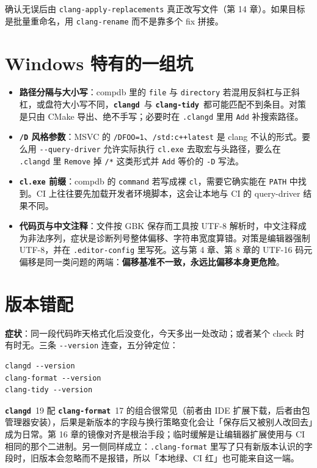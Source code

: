 \documentclass[12pt,a4paper,fontset=fandol]{ctexbook}
\newcommand{\Opt}[1]{\texttt{-\/-#1}}
\newcommand{\Lib}[1]{\textbf{\texttt{#1}}}
\newcommand{\Tidy}{\Lib{clang-tidy}}
\newcommand{\Fmt}{\Lib{clang-format}}
\newcommand{\CD}{\Lib{clangd}}
\begin{document}
确认无误后由 \texttt{clang-apply-replacements} 真正改写文件（第 14 章）。如果目标是批量重命名，用 \texttt{clang-rename} 而不是靠多个 fix 拼接。

\section{Windows 特有的一组坑}\label{sec:ch17-s9}

\begin{itemize}
  \item \textbf{路径分隔与大小写}：compdb 里的 \texttt{file} 与 \texttt{directory} 若混用反斜杠与正斜杠，或盘符大小写不同，\CD\ 与 \Tidy\ 都可能匹配不到条目。对策是只由 CMake 导出、绝不手写；必要时在 \texttt{.clangd} 里用 \texttt{Add} 补搜索路径。
  \item \textbf{\texttt{/D} 风格参数}：MSVC 的 \texttt{/DFOO=1}、\texttt{/std:c++latest} 是 clang 不认的形式。要么用 \Opt{query-driver} 允许实际执行 \texttt{cl.exe} 去取宏与头路径，要么在 \texttt{.clangd} 里 \texttt{Remove} 掉 \texttt{/*} 这类形式并 \texttt{Add} 等价的 \texttt{-D} 写法。
  \item \textbf{\texttt{cl.exe} 前缀}：compdb 的 \texttt{command} 若写成裸 \texttt{cl}，需要它确实能在 \texttt{PATH} 中找到。CI 上往往要先加载开发者环境脚本，这会让本地与 CI 的 query-driver 结果不同。
  \item \textbf{代码页与中文注释}：文件按 GBK 保存而工具按 UTF-8 解析时，中文注释成为非法序列，症状是诊断列号整体偏移、字符串宽度算错。对策是编辑器强制 UTF-8，并在 \texttt{.editor-\allowbreak config} 里写死。这与第 4 章、第 8 章的 UTF-16 码元偏移是同一类问题的两端：\textbf{偏移基准不一致，永远比偏移本身更危险}。
\end{itemize}

\section{版本错配}\label{sec:ch17-s10}

\textbf{症状}：同一段代码昨天格式化后没变化，今天多出一处改动；或者某个 check 时有时无。三条 \Opt{version} 连查，五分钟定位：

\begin{lstlisting}[style=shellstyle,caption={三个工具必须来自同一个 release}]
clangd --version
clang-format --version
clang-tidy --version
\end{lstlisting}

\CD\ 19 配 \Fmt\ 17 的组合很常见（前者由 IDE 扩展下载，后者由包管理器安装），后果是新版本的字段与换行策略变化会让「保存后又被别人改回去」成为日常。第 16 章的镜像对齐是根治手段；临时缓解是让编辑器扩展使用与 CI 相同的那个二进制。另一侧同样成立：\texttt{.clang-format} 里写了只有新版本认识的字段时，旧版本会忽略而不是报错，所以「本地绿、CI 红」也可能来自这一端。
\end{document}
